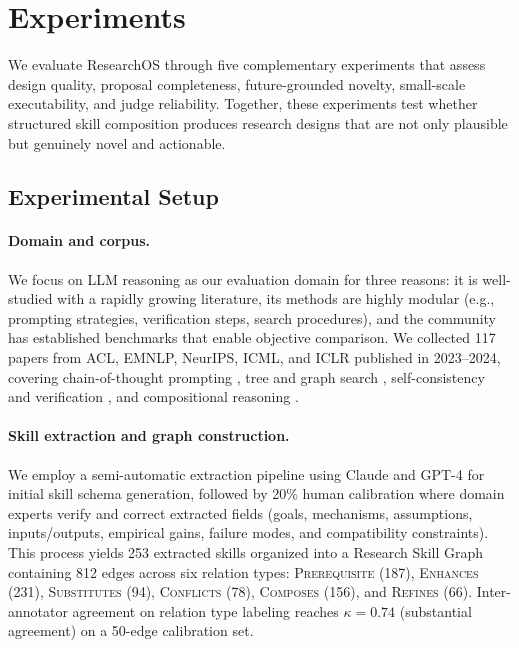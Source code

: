 \section{Experiments}
\label{sec:experiments}

We evaluate ResearchOS through five complementary experiments that assess design quality, proposal completeness, future-grounded novelty, small-scale executability, and judge reliability. Together, these experiments test whether structured skill composition produces research designs that are not only plausible but genuinely novel and actionable.

\subsection{Experimental Setup}
\label{subsec:setup}

\paragraph{Domain and corpus.}
We focus on LLM reasoning as our evaluation domain for three reasons: it is well-studied with a rapidly growing literature, its methods are highly modular (e.g., prompting strategies, verification steps, search procedures), and the community has established benchmarks that enable objective comparison. We collected 117 papers from ACL, EMNLP, NeurIPS, ICML, and ICLR published in 2023--2024, covering chain-of-thought prompting \cite{wei2022chain}, tree and graph search \cite{yao2023tree, besta2024got}, self-consistency and verification \cite{wang2023selfconsistency, shinn2023reflexion}, and compositional reasoning \cite{lu2023chameleon}.

\paragraph{Skill extraction and graph construction.}
We employ a semi-automatic extraction pipeline using Claude \cite{anthropic2024claude} and GPT-4 \cite{openai2024gpt4} for initial skill schema generation, followed by 20\% human calibration where domain experts verify and correct extracted fields (goals, mechanisms, assumptions, inputs/outputs, empirical gains, failure modes, and compatibility constraints). This process yields 253 extracted skills organized into a Research Skill Graph containing 812 edges across six relation types: \textsc{Prerequisite} (187), \textsc{Enhances} (231), \textsc{Substitutes} (94), \textsc{Conflicts} (78), \textsc{Composes} (156), and \textsc{Refines} (66). Inter-annotator agreement on relation type labeling reaches $\kappa = 0.74$ (substantial agreement) on a 50-edge calibration set.

